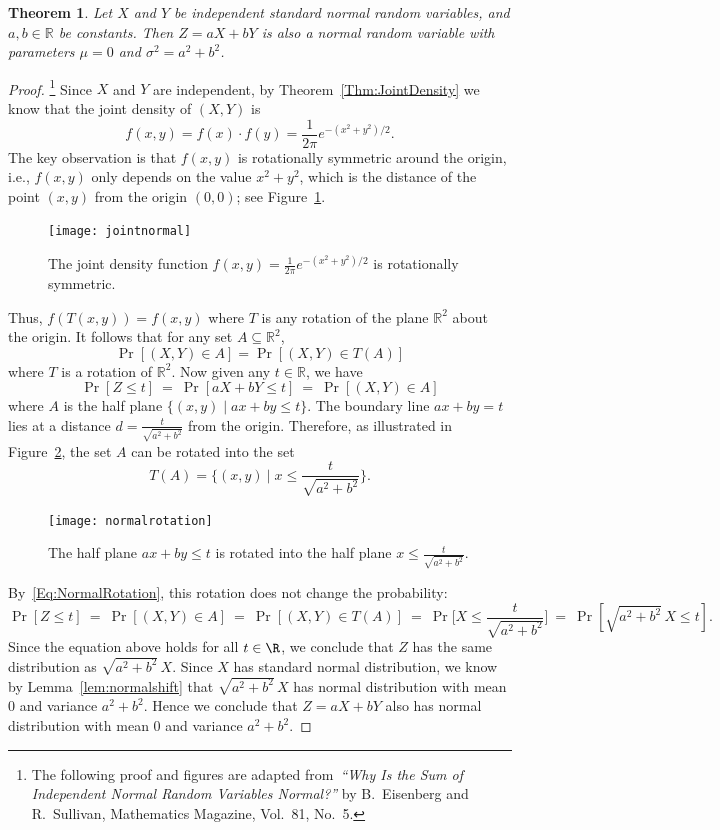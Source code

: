 \documentclass[11pt]{article}
\newcounter{thm}
\newtheorem{theorem}{Theorem}[thm]
\begin{document}
\begin{theorem}\label{thm:normalsum}
Let $X$ and $Y$ be independent standard normal random variables, and $a,b \in \mathbb{R}$ be constants. Then
$Z = aX + bY$ is also a normal random variable with parameters $\mu = 0$ and $\sigma^2 = a^2 + b^2$.
\end{theorem}
\begin{proof}\footnote{The following proof and figures are adapted from~{\em ``Why Is the Sum of Independent Normal Random Variables Normal?''} by B.~Eisenberg and R.~Sullivan, Mathematics Magazine, Vol.~81, No.~5.}
Since $X$ and $Y$ are independent, by Theorem~\ref{Thm:JointDensity} we know that the joint density of $(X,Y)$ is
$$f(x,y) = f(x) \cdot f(y) = \frac{1}{2\pi} e^{-(x^2+y^2)/2}.$$
The key observation is that $f(x,y)$ is rotationally symmetric around the origin, i.e., $f(x,y)$ only depends on the value $x^2 + y^2$,
which is the distance of the point $(x,y)$ from the origin $(0,0)$; see Figure~\ref{fig:jointnormal}.

\begin{figure}[h!]
\centering
\texttt{[image: jointnormal]}
\caption{The joint density function $f(x,y) = \frac{1}{2\pi} e^{-(x^2+y^2)/2}$ is rotationally symmetric.}
\label{fig:jointnormal}
\end{figure}

 Thus, $f(T(x,y)) = f(x,y)$ where $T$ is any rotation of the plane
$\mathbb{R}^2$ about the origin. It follows that for any set $A \subseteq \mathbb{R}^2$,
\begin{equation}\label{Eq:NormalRotation}
\Pr[(X,Y) \in A] = \Pr[(X,Y) \in T(A)]
\end{equation}
where $T$ is a rotation of $\mathbb{R}^2$. Now given any $t \in \mathbb{R}$, we have
$$\Pr[Z \le t] ~=~ \Pr[aX + bY \le t] ~=~ \Pr[(X,Y) \in A]$$
where $A$ is the half plane $\{(x,y) \mid ax + by \le t\}$. The boundary line $ax+by = t$ lies at a distance
$d = \frac{t}{\sqrt{a^2 + b^2}}$ from the origin. Therefore, as illustrated in Figure~\ref{fig:normalrotation}, the set $A$ can be rotated into the set
$$T(A) = \big\{(x,y) \: \big| \; x \le \frac{t}{\sqrt{a^2+b^2}} \big\}.$$

\begin{figure}[h!]
\centering
\texttt{[image: normalrotation]}
\caption{The half plane $ax+by \le t$ is rotated into the half plane $x \le \frac{t}{\sqrt{a^2+b^2}}$.}
\label{fig:normalrotation}
\end{figure}

By~\eqref{Eq:NormalRotation}, this rotation does not change the probability:
$$\Pr[Z \le t] ~=~ \Pr[(X,Y) \in A] ~=~ \Pr[(X,Y) \in T(A)] ~=~ \Pr\Big[X \le \frac{t}{\sqrt{a^2+b^2}} \Big] ~=~ \Pr[\sqrt{a^2+b^2} \, X \le t].$$
Since the equation above holds for all $t \in \R$, we conclude that $Z $ has the same distribution as $\sqrt{a^2+b^2} \, X$. Since $X$ has standard normal distribution, we know by Lemma~\ref{lem:normalshift} that $\sqrt{a^2 + b^2} \, X$ has normal distribution with mean $0$ and variance $a^2+b^2$. Hence we conclude that $Z = aX + bY$ also has normal distribution with mean $0$ and variance $a^2+b^2$.
\end{proof}
\end{document}
